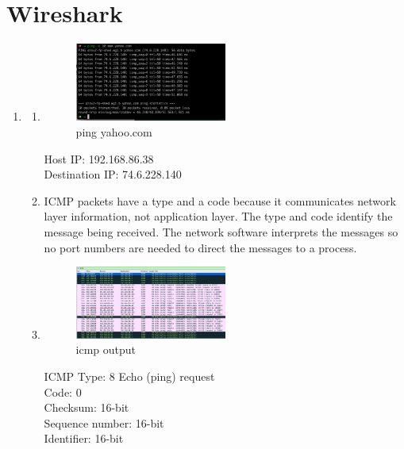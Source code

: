 \documentclass[11pt]{article}
\begin{document}
\section{Wireshark}
\begin{enumerate}[label=(\alph*)]
\item {
	\begin{enumerate} [label=(\arabic*)]
	
	\item {
		\begin{figure}[h] %
		\centering
		\includegraphics[width=0.5\textwidth]{cmd-output}
		\caption{ping yahoo.com}
		\end{figure}
		Host IP: 192.168.86.38 \\ 
		Destination IP: 74.6.228.140
	}
	
	\item {
		ICMP packets have a type and a code because it communicates network layer information, not application
		layer. The type and code identify the message being received. The network software interprets the messages 
		so no port numbers are needed to direct the messages to a process.
	}
	
	\item {
		\begin{figure}[h] %
		\centering
		\includegraphics[width=0.5\textwidth]{wireshark-output}
		\caption{icmp output}
		\end{figure}
		
		ICMP Type: 8 Echo (ping) request \\
		Code: 0 \\
		Checksum: 16-bit \\
		Sequence number: 16-bit \\
		Identifier: 16-bit \\
		
}
\end{enumerate}}
\end{enumerate}
\end{document}
